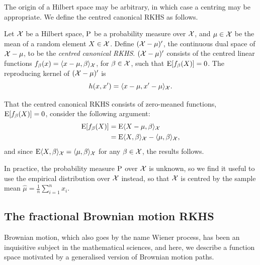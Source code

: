 The origin of a Hilbert space may be arbitrary, in which case a centring may be appropriate.
We define the centred canonical RKHS as follows.

\begin{definition}
  Let ${\mathcal X}$ be a Hilbert space, $\operatorname{P}$ be a probability measure over ${\mathcal X}$, and $\mu\in{\mathcal X}$ be the mean of a random element $X\in{\mathcal X}$. 
  Define $({\mathcal X} - \mu)'$, the continuous dual space of ${\mathcal X} - \mu$, to be the \emph{centred canonical RKHS}.
  $({\mathcal X} - \mu)'$ consists of the centred linear functions $f_\beta(x)=\langle x-\mu,\beta\rangle_{\mathcal X}$, for $\beta\in{\mathcal X}$, such that $\operatorname{E} [f_\beta(X)] = 0$.
  The reproducing kernel of $({\mathcal X} - \mu)'$ is
  \[
    h(x,x') = \langle x-\mu,x'-\mu\rangle_{\mathcal X}.
  \]
\end{definition}

That the centred canonical RKHS consists of zero-meaned functions, $\operatorname{E} [f_\beta(X)] = 0$, consider the following argument:
\vspace{-0.5em}
\begin{align*}
  \E [f_\beta(X)] 
  &= \E \ip{X-\mu,\beta}_\cX \\
  &= \E \ip{X,\beta}_\cX - \ip{\mu,\beta}_\cX, \vspace{-0.5em}
\end{align*}
and since $\operatorname{E} \langle X,\beta\rangle_{\mathcal X} = \langle\mu,\beta\rangle_{\mathcal X}$ for any $\beta\in{\mathcal X}$, the results follows.

\begin{remark}\label{rem:empircent}
  In practice, the probability measure $\operatorname{P}$ over ${\mathcal X}$ is unknown, so we find it useful to use the empirical distribution over ${\mathcal X}$ instead, so that ${\mathcal X}$ is centred by the sample mean $\hat\mu = \frac{1}{n}\sum_{i=1}^n x_i$.  
\end{remark}

\subsection{The fractional Brownian motion RKHS}

Brownian motion, which also goes by the name Wiener process, has been an inquisitive subject in the mathematical sciences, and here, we describe a function space motivated by a generalised version of Brownian motion paths.

